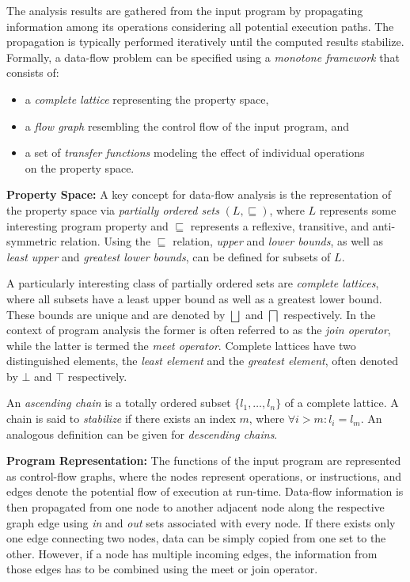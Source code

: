 The analysis results are gathered from the input program by propagating
information among its operations considering all potential execution paths. The
propagation is typically performed iteratively until the computed results
stabilize. Formally, a data-flow problem can be specified using a \emph{monotone
framework} that consists of:
\begin{itemize}
  \item a \emph{complete lattice} representing the property space,
  \item a \emph{flow graph} resembling the control flow of the input program, 
        and
  \item a set of \emph{transfer functions} modeling the effect of individual
        operations \\ on the property space.
\end{itemize}

\textbf{Property Space:}
A key concept for data-flow analysis is the representation of the property space
via \emph{partially ordered sets} $(L, \sqsubseteq)$, where $L$ represents some
interesting program property and $\sqsubseteq$ represents a reflexive, transitive, and
anti-symmetric relation. Using the $\sqsubseteq$ relation, \emph{upper} and
\emph{lower bounds}, as well as \emph{least upper} and \emph{greatest lower
bounds}, can be defined for subsets of $L$.

A particularly interesting class of partially ordered sets are \emph{complete
lattices}, where all subsets have a least upper bound as well as a greatest
lower bound. These bounds are unique and are denoted by $\bigsqcup$ and
$\bigsqcap$ respectively. In the context of program analysis the former is often
referred to as the \emph{join operator}, while the latter is termed the
\emph{meet operator}. Complete lattices have two distinguished elements, the
\emph{least element} and the \emph{greatest element}, often denoted by $\bot$
and $\top$ respectively.

An \emph{ascending chain} is a totally ordered subset $\{l_1, \ldots, l_n \}$ of
a complete lattice. A chain is said to \emph{stabilize} if there exists an index
$m$, where $\forall i > m \colon l_i = l_m$. An analogous definition can be
given for \emph{descending chains}.

\textbf{Program Representation:}
The functions of the input program are represented as control-flow graphs, where
the nodes represent operations, or instructions, and edges denote the potential
flow of execution at run-time.
Data-flow information is then propagated from one node to
another adjacent node along the respective graph edge using \emph{in} and
\emph{out} sets associated with every node. If there exists only one edge
connecting two nodes, data can be simply copied from one set to the other.
However, if a node has multiple incoming edges, the information from
those edges has to be combined using the meet or join operator.

